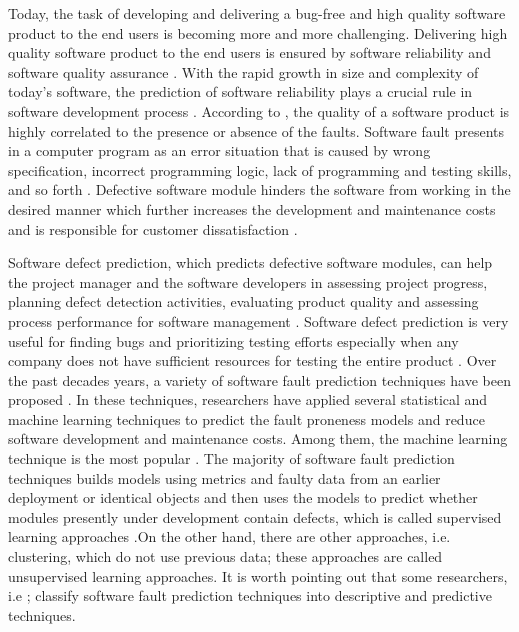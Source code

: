 \documentclass[runningheads,a4paper]{llncs}
\begin{document}
Today, the task of developing and delivering a bug-free and high quality software product to the end users is becoming more and more challenging. Delivering high quality software product to the end users is ensured by software reliability and software quality assurance \cite{rawat2012software}. With the rapid growth in size and complexity of today's software, the prediction of software reliability plays a crucial rule in software development process \cite{zheng2009predicting}. According to \cite{hall2012systematic,arisholm2010systematic}, the quality of a software product is highly correlated to the presence or absence of the faults. Software fault  presents in a computer program as an error situation that is caused by wrong specification, incorrect programming logic, lack of programming and testing skills, and so forth \cite{dowd2006art,abaei2014survey,tomar2016prediction}. Defective software module hinders the software from working in the desired manner which further increases the development and maintenance costs and is responsible for customer dissatisfaction \cite{fenton2000software,fenton2014software}.

Software defect prediction, which predicts defective software modules, can help the project manager and the software developers in assessing project progress, planning defect detection activities, evaluating product quality and assessing process performance for software management \cite{clark2001good}. Software defect prediction is very useful for finding bugs and prioritizing testing efforts especially when any company does not have sufficient resources for testing the entire product \cite{abaei2014survey,wang2016automatically}. Over the past decades years, a variety of software fault prediction techniques have been proposed \cite{hassan2009predicting,jiang2013personalized,jing2014dictionary, kim2007predicting,lee2011micro,meneely2008predicting,moser2008comparative,nagappan2007using,rahman2013and, wang2012compressed,zimmermann2007predicting,kanmani2007object,khoshgoftaar1999classification,selby1988learning, elish2008predicting,czibula2014software,guo2004robust,agarwal2014prediction,okutan2014software,de2010symbolic, vandecruys2008mining}. In these techniques, researchers have applied several statistical and machine learning techniques to predict the fault proneness models and reduce software development and maintenance costs. Among them, the machine learning technique is the most popular \cite{rawat2012software}. The majority of software fault prediction techniques builds models using metrics and faulty data from an earlier deployment or identical objects and then uses the models to predict whether modules presently under development contain defects, which is called supervised learning approaches \cite{abaei2014survey}.On the other hand, there are other approaches, i.e. clustering, which do not use previous data; these approaches are called unsupervised learning approaches. It is worth pointing out that some researchers, i.e \cite{koksal2011review}; classify software fault prediction techniques into descriptive and predictive techniques.
\end{document}
